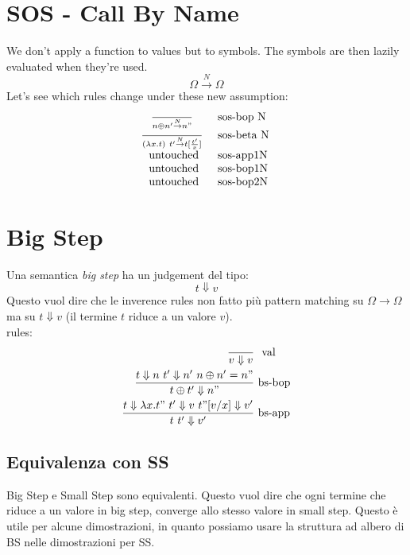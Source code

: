 \documentclass{article}
\newcommand{\na}[0]{\ensuremath {\overset{N}{\rightarrow}}}
\begin{document}
\section{SOS - Call By Name}
We don't apply a function to values but to symbols. The symbols are then lazily evaluated when they're used.
\[
    \Omega\na\Omega
\]
Let's see which rules change under these new assumption:
$$\begin{array}{c l}
    \frac{}{n\oplus n' \overset{N}{\rightarrow} n"}\ &\text{sos-bop N} \\
    \frac{}{(\lambda x.t)\ t'\na t[\frac {t'} x]}\   &\text{sos-beta N} \\
    \text{untouched}                                 &\text{sos-app1N } \\
    \text{untouched}                                 &\text{sos-bop1N } \\
    \text{untouched}                                 &\text{sos-bop2N } \\
\end{array}$$

\section{Big Step}
Una semantica \textit{big step} ha un judgement del tipo:
\[
    t\Downarrow v
\]
Questo vuol dire che le inverence rules non fatto più pattern matching su $\Omega\to\Omega$ ma su $t\Downarrow v$ (il termine $t$ riduce a un valore $v$). \\
rules:
\begin{align*}
    \frac{}{v\Downarrow v}\ &\text{ val} \\
    \frac{t\Downarrow n\ t'\Downarrow n'\ n\oplus n'=n"}{t\oplus t' \Downarrow n"}\ &\text{bs-bop} \\
    \frac{t\Downarrow \lambda x.t"\ t'\Downarrow v\ t"[v/x]\Downarrow v'}{t\ t'\Downarrow v'}\ &\text{bs-app} \\
\end{align*}

\subsection{Equivalenza con SS}
Big Step e Small Step sono equivalenti. Questo vuol dire che ogni termine che riduce a un valore in big step, converge allo stesso valore in small step. 
Questo è utile per alcune dimostrazioni, in quanto possiamo usare la struttura ad albero di BS nelle dimostrazioni per SS.
\end{document}
